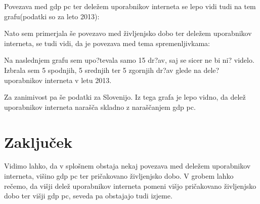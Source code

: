 \documentclass[11pt,a4paper]{article}
\begin{document}
\newpage
Povezava med gdp pc ter deležem uporabnikov interneta se lepo vidi tudi na tem grafu(podatki so za leto 2013):
\begin{figure}[h!] 
\begin{center}
 
 \end{center}
\end{figure}

\newpage
Nato sem primerjala še povezavo med življenjsko dobo ter deležem uporabnikov interneta, se tudi vidi, da je povezava med tema spremenljivkama:
\begin{figure}[h!] 
\begin{center}
 
 \end{center}
\end{figure}

\newpage
Na naslednjem grafu sem upo?tevala samo 15 dr?av, saj se sicer ne bi ni? videlo. Izbrala sem 5 spodnjih, 5 srednjih ter 5 zgornjih dr?av glede na dele? uporabnikov interneta v letu 2013.
\begin{figure}[h!] 
\begin{center}
 
 \end{center}
\end{figure}


\newpage
Za zanimivost pa še podatki za Slovenijo. Iz tega grafa je lepo vidno, da delež uporabnikov interneta narašča skladno z naraščanjem gdp pc.
\begin{figure}[h!] 
\begin{center}
 
 \end{center}
\end{figure}

\newpage
\section{Zaključek}
Vidimo lahko, da v splošnem obstaja nekaj povezava med deležem uporabnikov interneta, višino gdp pc ter pričakovano življenjsko dobo. V grobem lahko rečemo, da višji delež uporabnikov interneta pomeni višjo pričakovano življenjsko dobo ter višji gdp pc, seveda pa obstajajo tudi izjeme.
\end{document}
